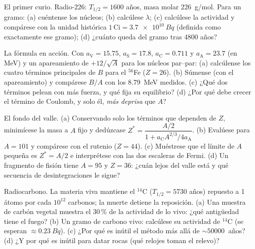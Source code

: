 \begin{exercise}[$\star$]\label{exo:b3:nuclear-physics:4}
El primer curio. Radio-226: $T_{1/2} = 1600$ años, masa molar
\qty{226}{g/mol}. Para un gramo: (a) cuéntense los núcleos; (b) calcúlese
$\lambda$; (c) calcúlese la actividad y compárese con la unidad
histórica $1\,\text{Ci} = \qty{3.7e10}{Bq}$ (definida como exactamente ese
gramo); (d) ¿cuánto queda del gramo tras 4800 años?
\end{exercise}

\begin{exercise}[$\star\star$]\label{exo:b3:nuclear-physics:5}
La fórmula en acción. Con $a_{\text{V}} = 15.75$,
$a_{\text{S}} = 17.8$, $a_{\text{C}} = 0.711$ y
$a_{\text{A}} = 23.7$ (en \unit{MeV}) y un apareamiento de
$+12/\sqrt A$ para los núcleos par--par: (a) calcúlense los cuatro términos
principales de $B$ para el $^{56}$Fe ($Z = 26$). (b) Súmense (con el apareamiento) y
compárese $B/A$ con los \qty{8.79}{MeV} medidos. (c) ¿Qué dos
términos pelean con más fuerza, y qué fija su equilibrio? (d) ¿Por qué
debe crecer el término de Coulomb, y solo él, \emph{más deprisa} que $A$?
\end{exercise}

\begin{exercise}[$\star\star$]\label{exo:b3:nuclear-physics:6}
El fondo del valle. (a) Conservando solo los términos que dependen de $Z$,
minimícese la masa a $A$ fijo y dedúzcase
$Z^* = \dfrac{A/2}{1 + a_{\text{C}}A^{2/3}/4a_{\text{A}}}$. (b)
Evalúese para $A = 101$ y compárese con el rutenio ($Z = 44$).
(c) Muéstrese que el límite de $A$ pequeña es $Z^* = A/2$ e interprétese con
las dos escaleras de Fermi. (d) Un fragmento de fisión tiene $A = 95$ y
$Z = 36$: ¿cuán lejos del valle está y qué secuencia de
desintegraciones le sigue?
\end{exercise}

\begin{exercise}[$\star\star$]\label{exo:b3:nuclear-physics:7}
Radiocarbono. La materia viva mantiene el $^{14}$C
($T_{1/2} = 5730$ años) repuesto a 1 átomo por cada $10^{12}$
carbonos; la muerte detiene la reposición. (a) Una muestra de carbón vegetal muestra el
30\,\% de la actividad de lo vivo: ¿qué antigüedad tiene el fuego? (b) Un gramo
de carbono vivo: calcúlese su actividad de $^{14}$C
(se esperan $\approx\qty{0.23}{Bq}$). (c) ¿Por qué es inútil el método
más allá de $\sim\qty{50000}{}$ años? (d) ¿Y por qué es inútil para
datar rocas (qué relojes toman el relevo)?
\end{exercise}

